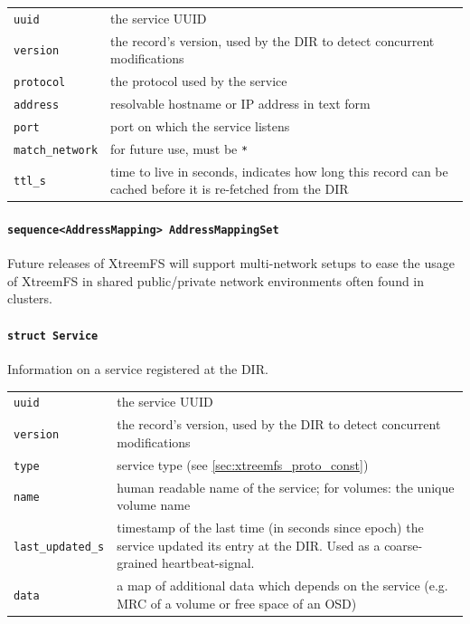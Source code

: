 \begin{tabularx}{\textwidth}{lX}
 \texttt{uuid} & the service UUID\\
 \texttt{version} & the record's version, used by the DIR\index{DIR} to detect concurrent modifications\\
 \texttt{protocol} & the protocol used by the service\\
 \texttt{address} & resolvable hostname or IP address in text form\\
 \texttt{port} & port on which the service listens\\
 \texttt{match\_network} & for future use, must be \texttt{*}\\
 \texttt{ttl\_s} & time to live in seconds, indicates how long this record can be cached before it is re-fetched from the DIR\index{DIR}\\
\end{tabularx}

\paragraph{\texttt{sequence<AddressMapping> AddressMappingSet}}
Future releases of XtreemFS will support multi-network setups to ease the usage of XtreemFS in shared public/private network environments often found in clusters.


\paragraph{\texttt{struct Service}}
Information on a service registered at the DIR.

\begin{tabularx}{\textwidth}{lX}
 \texttt{uuid} & the service UUID\\
 \texttt{version} & the record's version, used by the DIR\index{DIR} to detect concurrent modifications\\
 \texttt{type} & service type (see \ref{sec:xtreemfs_proto_const})\\
 \texttt{name} & human readable name of the service; for volumes: the unique volume name\\
 \texttt{last\_updated\_s} & timestamp of the last time (in seconds since epoch) the service updated its entry at the DIR\index{DIR}. Used as a coarse-grained heartbeat-signal.\\
 \texttt{data} & a map of additional data which depends on the service (e.g. MRC\index{MRC} of a volume or free space of an OSD\index{OSD})\\
\end{tabularx}


